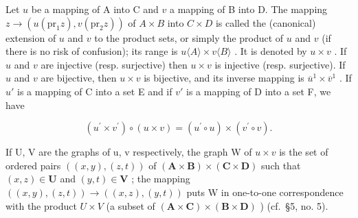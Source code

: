Let \(u\) be a mapping of A into C and \(v\) a mapping of B into D. The mapping \(z \to (u(\mathrm{pr}_1z), v(\mathrm{pr}_2z))\) of \(A \times B\) into \(C \times D\) is called the (canonical) extension of \(u\) and \(v\) to the product sets, or simply the product of \(u\) and \(v\) (if there is no risk of confusion); its range is \(u\langle A\rangle \times v\langle B\rangle\) . It is denoted by \(u \times v\) . If \(u\) and \(v\) are injective (resp. surjective) then \(u \times v\) is injective (resp. surjective). If \(u\) and \(v\) are bijective, then \(u \times v\) is bijective, and its inverse mapping is \(\overline{u}^1 \times \overline{v}^1\) . If \(u'\) is a mapping of C into a set E and if \(v'\) is a mapping of D into a set F, we have

\[
\left(u ^ {\prime} \times v ^ {\prime}\right) \circ (u \times v) = \left(u ^ {\prime} \circ u\right) \times \left(v ^ {\prime} \circ v\right).
\]

If U, V are the graphs of u, v respectively, the graph W of \(u \times v\) is the set of ordered pairs \(((x, y), (z, t))\) of \((\mathbf{A} \times \mathbf{B}) \times (\mathbf{C} \times \mathbf{D})\) such that \((x, z) \in \mathbf{U}\) and \((y, t) \in \mathbf{V}\) ; the mapping \(((x, y), (z, t)) \to ((x, z), (y, t))\) puts W in one-to-one correspondence with the product \(U \times V\) (a subset of \((\mathbf{A} \times \mathbf{C}) \times (\mathbf{B} \times \mathbf{D})\) ) (cf.~§5, no. 5).

